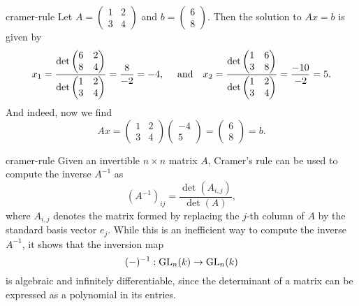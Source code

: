 \begin{example}{cramer-rule}
    Let $A = \begin{pmatrix} 1 & 2 \\ 3 & 4 \end{pmatrix}$ and $b = \begin{pmatrix} 6 \\ 8 \end{pmatrix}$. Then the solution to $Ax = b$ is given by
    \[ x_1 = \frac{\det \begin{pmatrix} 6 & 2 \\ 8 & 4 \end{pmatrix}}{\det \begin{pmatrix} 1 & 2 \\ 3 & 4 \end{pmatrix}} = \frac{8}{-2} = -4, \quad \textup{ and} \quad x_2 = \frac{\det \begin{pmatrix} 1 & 6 \\ 3 & 8 \end{pmatrix}}{\det \begin{pmatrix} 1 & 2 \\ 3 & 4 \end{pmatrix}} = \frac{-10}{-2} = 5 . \]
    And indeed, now we find
    \[ Ax = \begin{pmatrix} 1 & 2 \\ 3 & 4 \end{pmatrix} \begin{pmatrix} -4 \\ 5 \end{pmatrix} = \begin{pmatrix} 6 \\ 8 \end{pmatrix} = b . \]
\end{example}

\begin{example}{cramer-rule}
    Given an invertible $n \times n$ matrix $A$, Cramer's rule can be used to compute the inverse $A^{-1}$ as
    \[ \left( A^{-1} \right)_{ij} = \frac{\det(A_{i, j})}{\det(A)} , \]
    where $A_{i, j}$ denotes the matrix formed by replacing the $j$-th column of $A$ by the standard basis vector $e_j$. While this is an inefficient way to compute the inverse $A^{-1}$, it shows that the inversion map
    \[ (-)^{-1} : \textup{GL}_n(k) \to \textup{GL}_n(k) \]
    is algebraic and infinitely differentiable, since the determinant of a matrix can be expressed as a polynomial in its entries.
\end{example}

